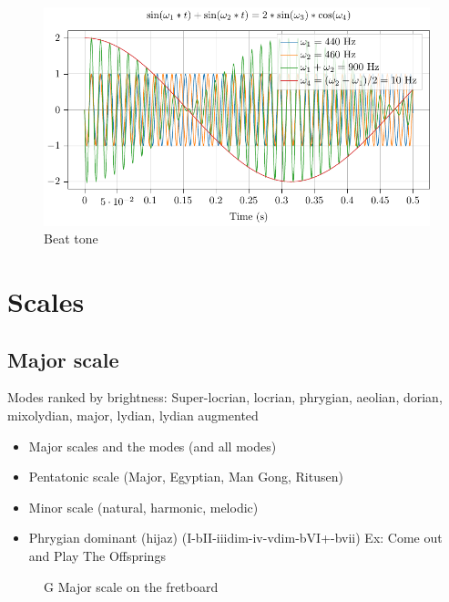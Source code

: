 \documentclass{article}
\begin{document}
\begin{figure}[h!]
	\centering
	\hspace*{0cm}
	\includegraphics[scale=0.5, trim= {0cm 0cm 0cm 0cm}, clip]{battement/main.pdf}
	\caption{Beat tone}
	\label{fig}
\end{figure}


\newpage
\section{Scales}



\newpage
\subsection{Major scale}
Modes ranked by brightness: Super-locrian, locrian, phrygian, aeolian, dorian, mixolydian, major, lydian, lydian augmented

\begin{itemize}
	\item Major scales and the modes (and all modes)
	\item Pentatonic scale (Major, Egyptian, Man Gong, Ritusen)
	\item Minor scale (natural, harmonic, melodic)
	\item Phrygian dominant (hijaz) (I-bII-iiidim-iv-vdim-bVI+-bvii)  Ex: Come out and Play The Offsprings
\end{itemize}

\begin{figure}[h!]
	\centering
	\hspace*{-2cm}
	\scalebox{0.5}{}
	\caption{G Major scale on the fretboard}
	\label{fig:gamme_majeure_manche}
\end{figure}
\end{document}
